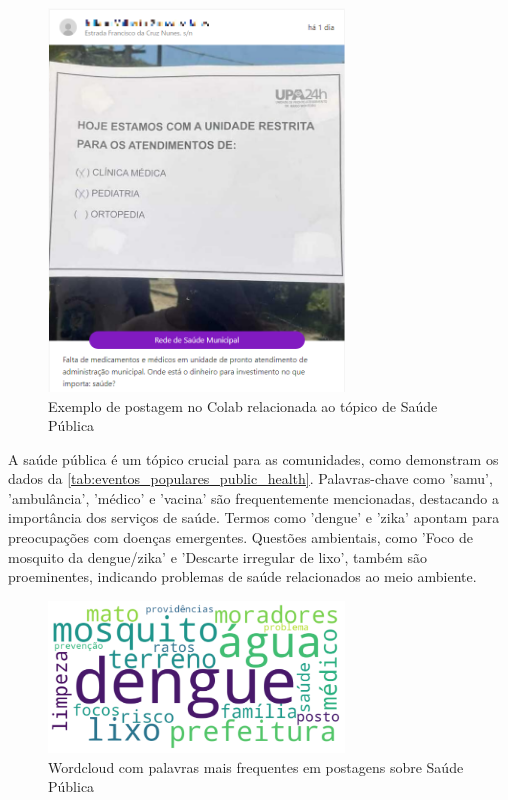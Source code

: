 \begin{figure}[htb]
	\centering
	\includegraphics[width=0.7\textwidth]{images/colab_posts_health.png}
	\caption{Exemplo de postagem no Colab relacionada ao tópico de Saúde Pública}
	\label{fig:colab_posts_health}
\end{figure}

A saúde pública é um tópico crucial para as comunidades, como demonstram os dados da \autoref{tab:eventos_populares_public_health}. Palavras-chave como 'samu', 'ambulância', 'médico' e 'vacina' são frequentemente mencionadas, destacando a importância dos serviços de saúde. Termos como 'dengue' e 'zika' apontam para preocupações com doenças emergentes. Questões ambientais, como 'Foco de mosquito da dengue/zika' e 'Descarte irregular de lixo', também são proeminentes, indicando problemas de saúde relacionados ao meio ambiente.

\begin{figure}[htb]
	\centering
	\includegraphics[width=0.7\textwidth]{images/wordcloud_public_health.png}
	\caption{Wordcloud com palavras mais frequentes em postagens sobre Saúde Pública}
	\label{fig:wordcloud_public_health}
\end{figure}


